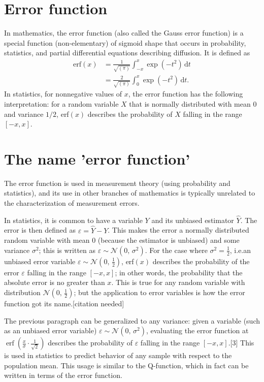 \documentclass[a4paper,oneside,11pt,article]{memoir}
\begin{document}
\chapter{Error function}
In mathematics, the error function (also called the Gauss error function) is a special function (non-elementary) of sigmoid shape that occurs in probability, statistics, and partial differential equations describing diffusion. It is defined as
\begin{align}
\text{erf}(x) &= \frac{1}{\sqrt{(\pi)}} \int_{-x}^{x} \exp(- t^2) \, \text{d}t \nonumber\\
&= \frac{2}{\sqrt{(\pi)}} \int_{0}^{x} \exp(- t^2) \, \text{d}t.
\end{align}
In statistics, for nonnegative values of $x$, the error function has the following interpretation: for a random variable $X$ that is normally distributed with mean $0$ and variance $1/2$, erf$(x)$ describes the probability of $X$ falling in the range $[-x, x]$.

\chapter{The name 'error function'}
The error function is used in measurement theory (using probability and statistics), and its use in other branches of mathematics is typically unrelated to the characterization of measurement errors.

In statistics, it is common to have a variable ${\displaystyle Y}$ and its unbiased estimator ${\displaystyle {\hat {Y}}}$. The error is then defined as ${\displaystyle \varepsilon ={\hat {Y}}-Y}$. This makes the error a normally distributed random variable with mean $0$ (because the estimator is unbiased) and some variance ${\displaystyle \sigma ^{2}}$; this is written as ${\textstyle \varepsilon \sim {\mathcal {N}}(0,\,\sigma ^{2})}$. For the case where ${\textstyle \sigma ^{2}={\frac {1}{2}}}$, i.e.\@ an unbiased error variable ${\textstyle \varepsilon \sim {\mathcal {N}}(0,\,{\frac {1}{2}})}$, erf$(x)$ describes the probability of the error $\varepsilon$ falling in the range $[-x, x]$; in other words, the probability that the absolute error is no greater than $x$. This is true for any random variable with distribution ${\textstyle {\mathcal {N}}(0,\,{\frac {1}{2}})}$; but the application to error variables is how the error function got its name.[citation needed]

The previous paragraph can be generalized to any variance: given a variable (such as an unbiased error variable) ${\textstyle \varepsilon \sim {\mathcal {N}}(0,\,\sigma ^{2})}$, evaluating the error function at ${\textstyle \operatorname {erf} \left({\frac {x}{\sigma }}\cdot {\frac {1}{\sqrt {2}}}\right)}$ describes the probability of $\varepsilon$ falling in the range $[-x, x]$.[3] This is used in statistics to predict behavior of any sample with respect to the population mean. This usage is similar to the Q-function, which in fact can be written in terms of the error function.
\end{document}
